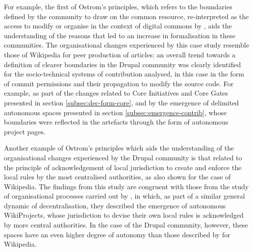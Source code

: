 For example, the first of Ostrom's principles, which refers to the boundaries defined by the community to draw on the common resource, re-interpreted as the access to modify or organise in the context of digital commons by \textcite{forte2009decentralization}, aids the understanding of the reasons that led to an increase in formalisation in these communities. The organisational changes experienced by this case study resemble those of Wikipedia for peer production of articles: an overall trend towards a definition of clearer boundaries in the Drupal community was clearly identified for the socio-technical systems of contribution analysed, in this case in the form of commit permissions and their propagation to modify the source code. For example, as part of the changes related to Core Initiatives and Core Gates presented in section \ref{subsec:dec-form-core}, and by the emergence of delimited autonomous spaces presented in section \ref{subsec:emergence-contrib}, whose boundaries were reflected in the artefacts through the form of autonomous project pages.

Another example of Ostrom's principles which aids the understanding of the organisational changes experienced by the Drupal community is that related to the principle of acknowledgement of local jurisdiction to create and enforce the local rules by the most centralised authorities, as also shown for the case of Wikipedia. The findings from this study are congruent with those from the study of organisational processes carried out by \textcite{forte2009decentralization}, in which, as part of a similar general dynamic of decentralisation, they described the emergence of autonomous WikiProjects, whose jurisdiction to devise their own local rules is acknowledged by more central authorities. In the case of the Drupal community, however, these spaces have an even higher degree of autonomy than those described by \textcite[52]{forte2009decentralization} for Wikipedia.

